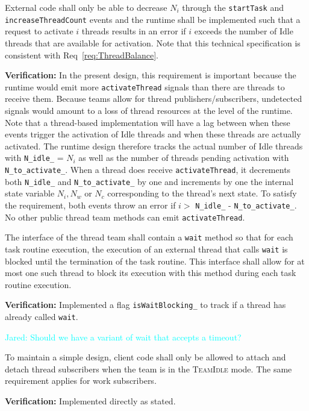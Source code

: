 \documentclass{article}
\newcommand{\TeamIdle}          {\textsc{TeamIdle}}
\newcommand{\Jared}[1]          {\textcolor{cyan}{Jared: #1}}
\newcommand{\taskroutine}        {task routine\xspace}
\begin{document}
\begin{spec}
External code shall only be able to decrease $N_i$ through the
\texttt{startTask} and \texttt{increaseThreadCount} events and the runtime shall
be implemented such that a request to activate $i$ threads results in an error
if $i$ exceeds the number of Idle threads that are available for activation.
Note that this technical specification is consistent with
Req~\ref{req:ThreadBalance}.
\end{spec}
\textbf{Verification:}\hspace{0.125in}  In the present design, this requirement
is important because the runtime would emit more \texttt{activateThread} signals
than there are threads to receive them.  Because teams allow for thread
publishers/subscribers, undetected signals would amount to a loss of thread
resources at the level of the runtime.  Note that a thread-based implementation
will have a lag between when these events trigger the activation of Idle threads
and when these threads are actually activated.  The runtime design therefore
tracks the actual number of Idle threads with \texttt{N\_idle\_} = $N_i$ as well
as the number of threads pending activation with \texttt{N\_to\_activate\_}.
When a thread does receive \texttt{activateThread}, it decrements both
\texttt{N\_idle\_} and \texttt{N\_to\_activate\_} by one and increments by one
the internal state variable $N_i, N_w$ or $N_c$ corresponding to the thread's
next state.  To satisfy the requirement, both events throw an error if $i > $
\texttt{N\_idle\_} - \texttt{N\_to\_activate\_}.  No other public thread team
methods can emit \texttt{activateThread}.

\begin{spec}
\label{spec:Runtime_OneWait}
The interface of the thread team shall contain a \texttt{wait} method so that
for each \taskroutine execution, the execution of an external thread that calls
\texttt{wait} is blocked until the termination of the \taskroutine.  This interface
shall allow for at most one such thread to block its execution with this method
during each \taskroutine execution.
\end{spec}
\textbf{Verification:}\hspace{0.125in}  Implemented a flag
\texttt{isWaitBlocking\_} to track if a thread has already called \texttt{wait}.

\Jared{Should we have a variant of wait that accepts a timeout?}

\begin{spec}
To maintain a simple design, client code shall only be allowed to attach and
detach thread subscribers when the team is in the {\TeamIdle} mode.  The same
requirement applies for work subscribers.
\end{spec}
\textbf{Verification:}\hspace{0.125in} Implemented directly as stated.
\end{document}
